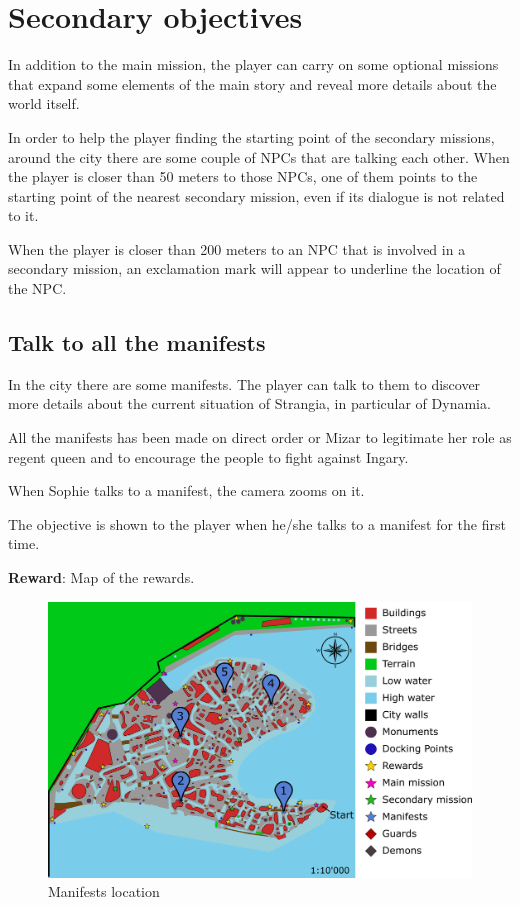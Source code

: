 \section{Secondary objectives}
In addition to the main mission, the player can carry on some optional missions that expand some elements of the main story and reveal more details about the world itself.

In order to help the player finding the starting point of the secondary missions, around the city there are some couple of NPCs that are talking each other. When the player is closer than 50 meters to those NPCs, one of them points to the starting point of the nearest secondary mission, even if its dialogue is not related to it.

When the player is closer than 200 meters to an NPC that is involved in a secondary mission, an exclamation mark will appear to underline the location of the NPC.

\subsection{Talk to all the manifests}
In the city there are some manifests. The player can talk to them to discover more details about the current situation of Strangia, in particular of Dynamia.

All the manifests has been made on direct order or Mizar to legitimate her role as regent queen and to encourage the people to fight against Ingary.

When Sophie talks to a manifest, the camera zooms on it.

The objective is shown to the player when he/she talks to a manifest for the first time.

\textbf{Reward}: Map of the rewards.

\begin{figure}[H]
  \centering
  \includegraphics[width=\textwidth]{../Images/Maps/dynamiaSecondaryMissions_Manifests}
  \caption{Manifests location}
\end{figure}

